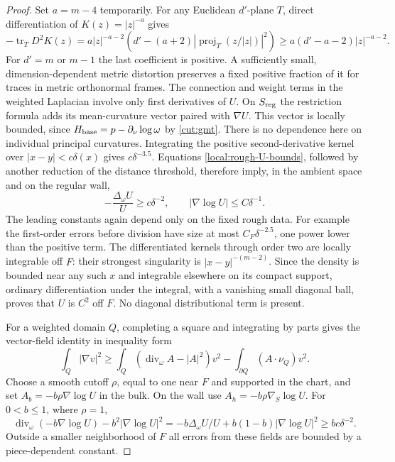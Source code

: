 \documentclass[11pt]{article}
\numberwithin{equation}{section}
\theoremstyle{definition}
\theoremstyle{remark}
\begin{document}
\begin{proof}
Set $a=m-4$ temporarily.  For any Euclidean $d'$-plane $T$, direct
differentiation of $K(z)=|z|^{-a}$ gives
\[
 -\operatorname{tr}_T D^2K(z)
 =a|z|^{-a-2}\left(d'-(a+2)|\operatorname{proj}_T(z/|z|)|^2\right)
 \ge a(d'-a-2)|z|^{-a-2}.
\]
For $d'=m$ or $m-1$ the last coefficient is positive.  A sufficiently
small, dimension-dependent metric distortion preserves a fixed
positive fraction of it for traces in metric orthonormal frames.
The connection and weight terms in the weighted Laplacian involve
only first derivatives of $U$.  On $S_{\rm reg}$ the restriction
formula adds its mean-curvature vector paired with $\nabla U$.
This vector is locally bounded, since
$H_{\rm base}=p-\partial_\nu\log\omega$ by \cref{cut:gmt}.
There is no dependence here on individual principal curvatures.
Integrating the positive second-derivative kernel over
$|x-y|<c\delta(x)$ gives $c\delta^{-3.5}$.  Equations
\eqref{local:rough-U-bounds}, followed by another reduction of the
distance threshold, therefore imply, in the ambient space and on
the regular wall,
\begin{equation}\label{local:U-superharmonic}
 -\frac{\Delta_\omega U}{U}\ge c\delta^{-2},
 \qquad |\nabla\log U|\le C\delta^{-1}.
\end{equation}
The leading constants again depend only on the fixed rough data.
For example the first-order errors before division have size at
most $C_F\delta^{-2.5}$, one power lower than the positive term.
The differentiated kernels through order two are locally integrable
off $F$: their strongest singularity is $|x-y|^{-(m-2)}$.
Since the density is bounded near any such $x$ and integrable
elsewhere on its compact support, ordinary differentiation under
the integral, with a vanishing small diagonal ball, proves that
$U$ is $C^2$ off $F$.  No diagonal distributional term is present.

For a weighted domain $Q$, completing a square and integrating by
parts gives the vector-field identity in inequality form
\begin{equation}\label{local:vector-hardy}
 \int_Q|\nabla v|^2\ge
 \int_Q(\operatorname{div}_\omega A-|A|^2)v^2
       -\int_{\partial Q}(A\cdot\nu_Q)v^2.
\end{equation}
Choose a smooth cutoff $\rho$, equal to one near $F$ and supported
in the chart, and set $A_b=-b\rho\nabla\log U$ in the bulk.  On the
wall use $A_h=-b\rho\nabla_S\log U$.  For $0<b\le1$, where $\rho=1$,
\[
 \operatorname{div}_\omega(-b\nabla\log U)-b^2|\nabla\log U|^2
 =-b\Delta_\omega U/U+b(1-b)|\nabla\log U|^2
 \ge bc\delta^{-2}.
\]
Outside a smaller neighborhood of $F$ all errors from these fields
are bounded by a piece-dependent constant.


\end{proof}
\end{document}
